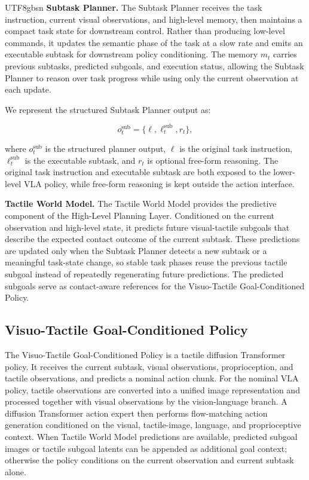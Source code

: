 \documentclass[]{mpai_report}
\begin{document}
\begin{CJK*}{UTF8}{gbsn}
\noindent\textbf{Subtask Planner.}
The Subtask Planner receives the task instruction, current visual observations, and high-level memory, then maintains a compact task state for downstream control.
Rather than producing low-level commands, it updates the semantic phase of the task at a slow rate and emits an executable subtask for downstream policy conditioning.
The memory $m_t$ carries previous subtasks, predicted subgoals, and execution status, allowing the Subtask Planner to reason over task progress while using only the current observation at each update.

We represent the structured Subtask Planner output as:

\begin{equation}
    o_t^{\mathrm{sub}} = \{\ell, \ell_t^{\mathrm{sub}}, r_t\},
\end{equation}

where $o_t^{\mathrm{sub}}$ is the structured planner output, $\ell$ is the original task instruction, $\ell_t^{\mathrm{sub}}$ is the executable subtask, and $r_t$ is optional free-form reasoning.
The original task instruction and executable subtask are both exposed to the lower-level VLA policy, while free-form reasoning is kept outside the action interface.

\noindent\textbf{Tactile World Model.}
The Tactile World Model provides the predictive component of the High-Level Planning Layer.
Conditioned on the current observation and high-level state, it predicts future visual-tactile subgoals that describe the expected contact outcome of the current subtask.
These predictions are updated only when the Subtask Planner detects a new subtask or a meaningful task-state change, so stable task phases reuse the previous tactile subgoal instead of repeatedly regenerating future predictions.
The predicted subgoals serve as contact-aware references for the Visuo-Tactile Goal-Conditioned Policy.

\subsection{Visuo-Tactile Goal-Conditioned Policy}
\label{sec:goal_conditioned_policy}

The Visuo-Tactile Goal-Conditioned Policy is a tactile diffusion Transformer policy.
It receives the current subtask, visual observations, proprioception, and tactile observations, and predicts a nominal action chunk.
For the nominal VLA policy, tactile observations are converted into a unified image representation and processed together with visual observations by the vision-language branch.
A diffusion Transformer action expert then performs flow-matching action generation conditioned on the visual, tactile-image, language, and proprioceptive context.
When Tactile World Model predictions are available, predicted subgoal images or tactile subgoal latents can be appended as additional goal context; otherwise the policy conditions on the current observation and current subtask alone.


\end{CJK*}
\end{document}
